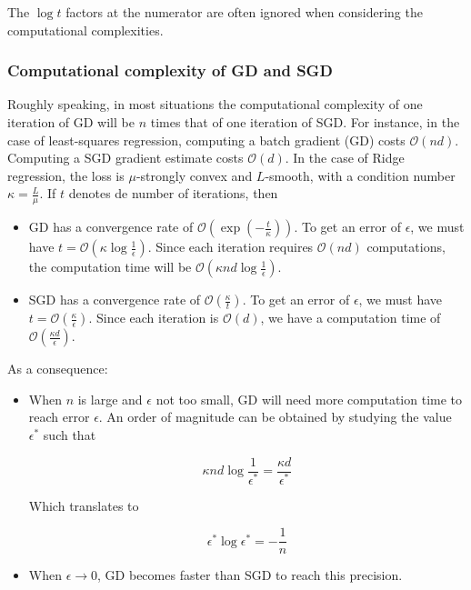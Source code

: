 \documentclass[
10pt, %
a4paper, %
oneside, %
headinclude,footinclude, %
BCOR5mm, %
]{scrartcl}
\begin{document}
\begin{remark}
    The $\log t$ factors at the numerator are often ignored when considering the computational complexities.
\end{remark}

\subsubsection{\large\color{Periwinkle}Computational complexity of GD and SGD}

Roughly speaking, in most situations the computational complexity of one
iteration of GD will be $n$ times that of one iteration of SGD. For instance, in the case of least-squares regression, computing a batch gradient (GD) costs $ \mathcal{O} (nd)$. Computing a SGD gradient estimate costs $ \mathcal{O} (d)$. In the case of Ridge regression, the loss is $\mu$-strongly convex and $L$-smooth, with a condition number $\kappa = \frac{L}{\mu} $. If $t$ denotes de number of iterations, then
\begin{itemize}
    \item GD has a convergence rate of $\mathcal{O} (\exp( - \frac{t}{\kappa} ))$. To get an error of $\epsilon$, we must have $ t= \mathcal{O} ( \kappa \log \frac{1}{\epsilon} )$. Since each iteration requires $ \mathcal{O} (nd)$ computations, the computation time will be $ \mathcal{O} (\kappa nd\log\frac{1}{\epsilon}) $.
    \item SGD has a convergence rate of $ \mathcal{O} ( \frac{\kappa}{t} )$. To get an error of $\epsilon$, we must have $ t = \mathcal{O}( \frac{\kappa}{\epsilon} ) $. Since each iteration is $ \mathcal{O} (d)$, we have a computation time of $ \mathcal{O} ( \frac{\kappa d}{\epsilon} )$.

\end{itemize}

As a consequence:
\begin{itemize}
    \item When $n$ is large and $\epsilon$ not too small, GD will need more computation time to reach error $\epsilon$. An order of magnitude can be obtained by studying the value $\epsilon^*$ such that

	\begin{equation}
	   \kappa nd \log \frac{1}{\epsilon^*}  = \frac{\kappa d}{\epsilon^*} 
	\end{equation}

	Which translates to

	\begin{equation}
	    \epsilon^* \log \epsilon^* = -\frac{1}{n}  
	\end{equation}
    \item When $\epsilon \rightarrow 0$, GD becomes faster than SGD to reach this precision.
\end{itemize}
\end{document}
